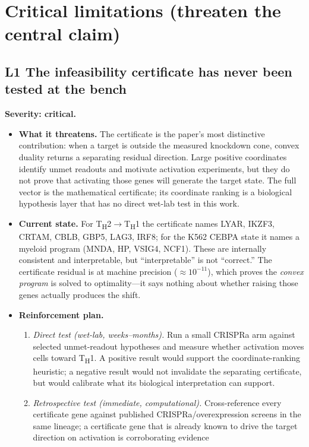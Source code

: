 \documentclass[11pt]{article}
\newcommand{\Th}[1]{T\textsubscript{H}#1}
\newcommand{\sev}[2]{\textcolor{#1}{\textbf{#2}}}
\begin{document}
\section{Critical limitations (threaten the central claim)}

\subsection{L1 \quad The infeasibility certificate has never been tested at the bench}
\sev{sev1}{Severity: critical.}
\begin{itemize}
\item[] \textbf{What it threatens.} The certificate is the paper's most distinctive
contribution: when a target is outside the measured knockdown cone, convex duality returns a
separating residual direction. Large positive coordinates identify unmet readouts and motivate
activation experiments, but they do not prove that activating those genes will generate the
target state. The full vector is the mathematical certificate; its coordinate ranking is a
biological hypothesis layer that has no direct wet-lab test in this work.
\item[] \textbf{Current state.} For \Th{2}$\rightarrow$\Th{1} the certificate names LYAR, IKZF3,
CRTAM, CBLB, GBP5, LAG3, IRF8; for the K562 CEBPA state it names a myeloid program (MNDA, HP,
VSIG4, NCF1). These are internally consistent and interpretable, but ``interpretable'' is not
``correct.'' The certificate residual is at machine precision ($\approx\!10^{-11}$), which
proves the \emph{convex program} is solved to optimality---it says nothing about whether raising
those genes actually produces the shift.
\item[] \textbf{Reinforcement plan.}
\begin{enumerate}
\item \emph{Direct test (wet-lab, weeks--months).} Run a small CRISPRa arm against selected
unmet-readout hypotheses and measure whether activation moves cells toward \Th{1}. A positive
result would support the coordinate-ranking heuristic; a negative result would not invalidate
the separating certificate, but would calibrate what its biological interpretation can support.
\item \emph{Retrospective test (immediate, computational).} Cross-reference every certificate
gene against published CRISPRa/overexpression screens in the same lineage; a certificate gene
that is already known to drive the target direction on activation is corroborating evidence

\end{enumerate}
\end{itemize}
\end{document}
